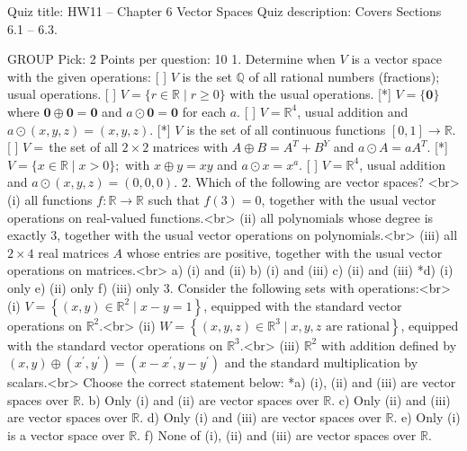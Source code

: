 Quiz title: HW11 -- Chapter 6 Vector Spaces
Quiz description: Covers Sections 6.1 -- 6.3.

GROUP
Pick: 2
Points per question: 10
1.  Determine when $V$ is a vector space with the given operations: %
[ ] $V$ is the set $\mathbb{Q}$ of all rational numbers (fractions); usual operations.
[ ] $V=\{r\in\mathbb{R}\mid r\geq0\}$ with the usual operations.
[*] $V=\{\mathbf{0}\}$ where $\mathbf{0}\oplus\mathbf{0}=\mathbf{0}$ and $a\odot\mathbf{0}=\mathbf{0}$ for each $a$.
[ ] $V=\mathbb{R}^{4}$, usual addition and $a\odot(x,y,z)=(x,y,z)$.
[*] $V$ is the set of all continuous functions $[0,1]\rightarrow\mathbb{R}$.
[ ] $V=\,$the set of all $2\times2$ matrices with $A\oplus B=A^{T}+B^{Y}$ and $a\odot A=aA^{T}$.
[*] $V=\{x\in\mathbb{R}\mid x>0\};$ with $x\oplus y=xy$ and $a\odot x=x^{a}$.
[ ] $V=\mathbb{R}^{4}$, usual addition and $a\odot(x,y,z)=(0,0,0)$.
2.  Which of the following are vector spaces?  <br>%
    (i)  all functions $f:\mathbb{R}\rightarrow\mathbb{R}$ such that $f(3)=0$, together with the usual vector operations on real-valued functions.<br>
    (ii)  all polynomials whose degree is exactly $3$, together with the usual vector operations on polynomials.<br>
    (iii)  all $2\times4$ real matrices $A$ whose entries are positive, together with the usual vector operations on matrices.<br>
a)  (i)  and (ii)
b)  (i) and (iii)
c)  (ii)  and (iii)
*d) (i)  only
e)  (ii)  only
f)  (iii)  only
3.  Consider the following sets with operations:<br> %
    (i)  $V=\left\{(x,y)\in\mathbb{R}^{2}\mid x-y=1\right\}$, equipped with the standard vector operations on $\mathbb{R}^{2}.$<br>
    (ii)  $W=\left\{(x,y,z)\in\mathbb{R}^{3}\mid x,y,z\text{ are rational} \right\}$, equipped with the standard vector operations on $\mathbb{R}^{3}.$<br>
    (iii)  $\mathbb{R}^{2}$ with addition defined by $(x,y)\oplus(x^{\prime},y^{\prime})=(x-x^{\prime},y-y^{\prime})$ and the standard multiplication by scalars.<br>
    Choose the correct statement below:
*a) (i), (ii)  and (iii)  are vector spaces over $\mathbb{R}$.
b)  Only (i)  and (ii)  are vector spaces over $\mathbb{R.}$
c)  Only (ii)  and (iii)  are vector spaces over $\mathbb{R}$.
d)  Only (i)  and (iii)  are vector spaces over $\mathbb{R}$.
e)  Only (i)  is a vector space over $\mathbb{R}$.
f)  None of (i), (ii)  and (iii)  are vector spaces over $\mathbb{R}$.
